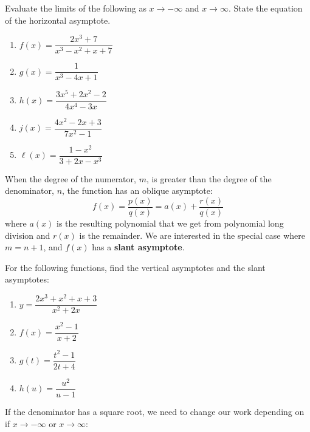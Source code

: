 \documentclass[answers]{exam}
\begin{document}
      \begin{ex*}
        Evaluate the limits of the following as $x\to-\infty$ and $x\to\infty$. State the equation of the horizontal asymptote.
        \begin{enumerate}
          \item $f(x)=\dfrac{2x^3+7}{x^3-x^2+x+7}$
          \item $g(x)=\dfrac{1}{x^3-4x+1}$
          \item $h(x)=\dfrac{3x^5+2x^2-2}{4x^4-3x}$
          \item $j(x)=\dfrac{4x^2-2x+3}{7x^2-1}$
          \item $\ell(x)=\dfrac{1-x^2}{3+2x-x^3}$
        \end{enumerate}
      \end{ex*}
      \pagebreak
      
      \begin{defn*}
      When the degree of the numerator, $m$, is greater than the degree of the denominator, $n$, the function has an oblique asymptote:
        $$f(x)=\dfrac{p(x)}{q(x)}=a(x)+\dfrac{r(x)}{q(x)}$$
      where $a(x)$ is the resulting polynomial that we get from polynomial long division and $r(x)$ is the remainder. We are interested in the special case where $m=n+1$, and $f(x)$ has a \textbf{slant asymptote}.
      \end{defn*}
      \begin{ex*}
        For the following functions, find the vertical asymptotes and the slant asymptotes:
      \end{ex*}
      \begin{enumerate}[itemsep=\stretch{1}]
        \item $y=\dfrac{2x^3+x^2+x+3}{x^2+2x}$
        \item $f(x)=\dfrac{x^2-1}{x+2}$
      \end{enumerate}
      \pagebreak
      \begin{enumerate}[itemsep=\stretch{1}]
        \setcounter{enumi}{2}
        \item $g(t)=\dfrac{t^2-1}{2t+4}$
        \item $h(u)=\dfrac{u^2}{u-1}$
      \end{enumerate}
      \pagebreak
      If the denominator has a square root, we need to change our work depending on if $x\to-\infty$ or $x\to\infty$:\\
      
\end{document}
